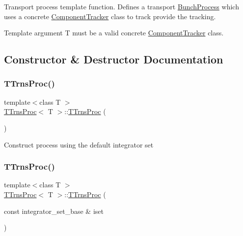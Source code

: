 Transport process template function. Defines a transport \hyperlink{classBunchProcess}{Bunch\+Process} which uses a concrete \hyperlink{classComponentTracker}{Component\+Tracker} class to track provide the tracking.

Template argument T must be a valid concrete \hyperlink{classComponentTracker}{Component\+Tracker} class. 

\subsection{Constructor \& Destructor Documentation}
\mbox{\label{classTTrnsProc_afbcef160143ed7d5994327d0ab188135}} 
\subsubsection{\texorpdfstring{T\+Trns\+Proc()}{TTrnsProc()}\hspace{0.1cm}{\footnotesize\ttfamily [1/2]}}
{\footnotesize\ttfamily template$<$class T $>$ \\
\hyperlink{classTTrnsProc}{T\+Trns\+Proc}$<$ T $>$\+::\hyperlink{classTTrnsProc}{T\+Trns\+Proc} (\begin{DoxyParamCaption}{ }\end{DoxyParamCaption})\hspace{0.3cm}{\ttfamily [inline]}}

Construct process using the default integrator set \mbox{\label{classTTrnsProc_a2016e23535409041dae3df438dba63d3}} 
\subsubsection{\texorpdfstring{T\+Trns\+Proc()}{TTrnsProc()}\hspace{0.1cm}{\footnotesize\ttfamily [2/2]}}
{\footnotesize\ttfamily template$<$class T $>$ \\
\hyperlink{classTTrnsProc}{T\+Trns\+Proc}$<$ T $>$\+::\hyperlink{classTTrnsProc}{T\+Trns\+Proc} (\begin{DoxyParamCaption}\item[{const integrator\+\_\+set\+\_\+base \&}]{iset }\end{DoxyParamCaption})\hspace{0.3cm}{\ttfamily [inline]}}

